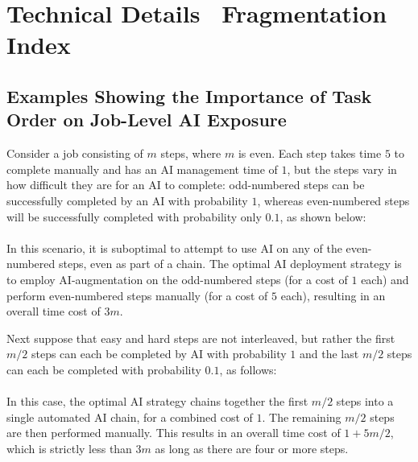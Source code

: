 \section{Technical Details \textendash \ Fragmentation Index}
\label{app:FI}

\renewcommand{\theproposition}{D.\arabic{proposition}}
\setcounter{proposition}{0}

\setcounter{lem}{0}


\subsection{Examples Showing the Importance of Task Order on Job-Level AI Exposure}
\label{app:examples.task.order}

\begin{example}
    Consider a job consisting of $m$ steps, where $m$ is even.  
    Each step takes time $5$ to complete manually and has an AI management time of $1$, but the steps vary in how difficult they are for an AI to complete: odd-numbered steps can be successfully completed by an AI with probability $1$, whereas even-numbered steps will be successfully completed with probability only $0.1$, as shown below:\\~\\
    
    In this scenario, it is suboptimal to attempt to use AI on any of the even-numbered steps, even as part of a chain.  
    The optimal AI deployment strategy is to employ AI-augmentation on the odd-numbered steps (for a cost of $1$ each) and perform even-numbered steps manually (for a cost of $5$ each), resulting in an overall time cost of $3m$.
\end{example}
\begin{example}
    Next suppose that easy and hard steps are not interleaved, but rather the first $m/2$ steps can each be completed by AI with probability $1$ and the last $m/2$ steps can each be completed with probability $0.1$, as follows:\\~\\
    
    In this case, the optimal AI strategy chains together the first $m/2$ steps into a single automated AI chain, for a combined cost of $1$. 
    The remaining $m/2$ steps are then performed manually.  
    This results in an overall time cost of $1 + 5m/2$, which is strictly less than $3m$ as long as there are four or more steps.
\end{example}


